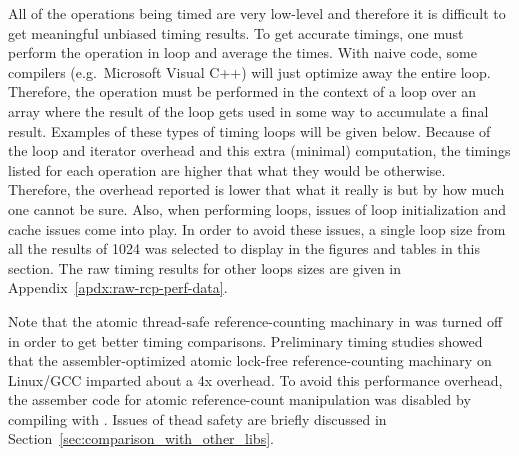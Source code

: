 \documentclass[pdf,ps2pdf,11pt]{SANDreport}
\begin{document}
All of the operations being timed are very low-level and therefore it
is difficult to get meaningful unbiased timing results.  To get
accurate timings, one must perform the operation in loop and average
the times.  With naive code, some compilers (e.g.\ Microsoft Visual
C++) will just optimize away the entire loop.  Therefore, the
operation must be performed in the context of a loop over an array
where the result of the loop gets used in some way to accumulate a
final result.  Examples of these types of timing loops will be given
below.  Because of the loop and iterator overhead and this extra
(minimal) computation, the timings listed for each operation are
higher that what they would be otherwise.  Therefore, the overhead
reported is lower that what it really is but by how much one cannot be
sure.  Also, when performing loops, issues of loop initialization and
cache issues come into play.  In order to avoid these issues, a single
loop size from all the results of 1024 was selected to display in the
figures and tables in this section.  The raw timing results for other
loops sizes are given in Appendix~\ref{apdx:raw-rcp-perf-data}.

Note that the atomic thread-safe reference-counting machinary in
{} was turned off in order to get better
timing comparisons.  Preliminary timing studies showed that the
assembler-optimized atomic lock-free reference-counting machinary on
Linux/GCC imparted about a 4x overhead.  To avoid this performance
overhead, the assember code for atomic reference-count manipulation
was disabled by compiling with {}.
Issues of thead safety are briefly discussed in
Section~\ref{sec:comparison_with_other_libs}.
\end{document}
